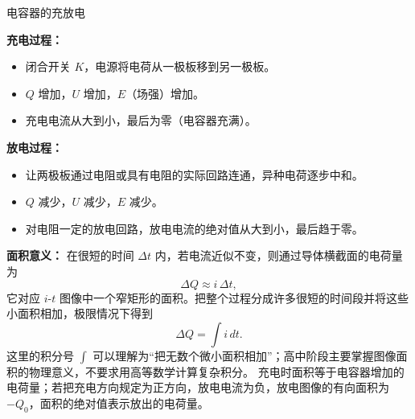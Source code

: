 \begin{conceptbox}{电容器的充放电}

\begin{center}


\label{fig:capacitor-circuit}
\end{center}

\textbf{充电过程：}
\begin{itemize}
  \item 闭合开关 $K$，电源将电荷从一极板移到另一极板。
  \item $Q$ 增加，$U$ 增加，$E$（场强）增加。
  \item 充电电流从大到小，最后为零（电容器充满）。
\end{itemize}

\textbf{放电过程：}
\begin{itemize}
  \item 让两极板通过电阻或具有电阻的实际回路连通，异种电荷逐步中和。
  \item $Q$ 减少，$U$ 减少，$E$ 减少。
  \item 对电阻一定的放电回路，放电电流的绝对值从大到小，最后趋于零。
\end{itemize}

\begin{center}


\label{fig:capacitor-current-time}
\end{center}

\textbf{面积意义：} 在很短的时间 $\Delta t$ 内，若电流近似不变，则通过导体横截面的电荷量为
\[
\Delta Q\approx i\,\Delta t,
\]
它对应 $i$-$t$ 图像中一个窄矩形的面积。把整个过程分成许多很短的时间段并将这些小面积相加，极限情况下得到
\[
\Delta Q=\int i\,dt.
\]
这里的积分号 $\int$ 可以理解为“把无数个微小面积相加”；高中阶段主要掌握图像面积的物理意义，不要求用高等数学计算复杂积分。
充电时面积等于电容器增加的电荷量；若把充电方向规定为正方向，放电电流为负，放电图像的有向面积为 $-Q_0$，面积的绝对值表示放出的电荷量。

\end{conceptbox}


